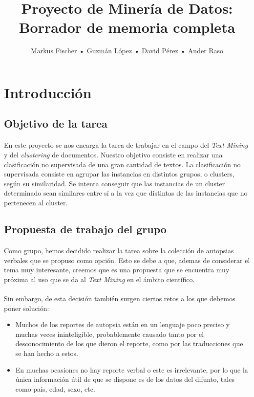 \documentclass[10pt,a4paper]{article}
\author{Markus Fischer • Guzmán López • David Pérez • Ander Raso}
\title{Proyecto de Minería de Datos: \linebreak Borrador de memoria completa}
\date{}
\begin{document}
\maketitle
\newpage

\tableofcontents
\newpage

\section{Introducción}
	\subsection{Objetivo de la tarea}
	\paragraph{}
	En este proyecto se nos encarga la tarea de trabajar en el campo del \textit{Text Mining} y del \textit{clustering} de documentos. Nuestro objetivo consiste en realizar una clasificación no supervisada de una gran cantidad de textos. La clasificación no supervisada consiste en agrupar las instancias en distintos grupos, o clusters, según su similaridad. Se intenta conseguir que las instancias de un cluster determinado sean similares entre sí a la vez que distintas de las instancias que no pertenecen al cluster.

	\subsection{Propuesta de trabajo del grupo}
	\paragraph{}
	Como grupo, hemos decidido realizar la tarea sobre la colección de autopsias verbales que se propuso como opción. Esto se debe a que, ademas de considerar el tema muy interesante, creemos que es una propuesta que se encuentra muy próxima al uso que se da al \textit{Text Mining} en el ámbito científico.
	\paragraph{}
    Sin embargo, de esta decisión también surgen ciertos retos a los que debemos poner solución:
	\begin{itemize}
		\item Muchos de los reportes de autopsia están en un lenguaje poco preciso y muchas veces ininteligible, probablemente causado tanto por el desconocimiento de los que dieron el reporte, como por las traducciones que se han hecho a estos.
		\item En muchas ocasiones no hay reporte verbal o este es irrelevante, por lo que la única información útil de que se dispone es de los datos del difunto, tales como país, edad, sexo, etc.
	\end{itemize}
\end{document}
